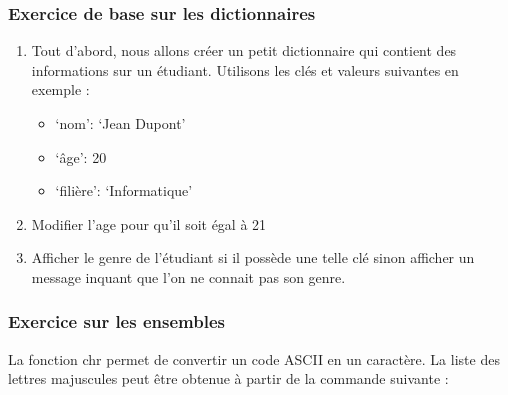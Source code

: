 \documentclass[letterpaper,10pt,english]{sphinxhowto}
\begin{document}
\subsubsection{Exercice de base sur les dictionnaires}
\label{\detokenize{cours3_conteneur_exercices:exercice-de-base-sur-les-dictionnaires}}\begin{enumerate}
%
\item {} 
\sphinxAtStartPar
Tout d’abord, nous allons créer un petit dictionnaire qui contient des informations sur un étudiant. Utilisons les clés et valeurs suivantes en exemple :
\begin{itemize}
\item {} 
\sphinxAtStartPar
‘nom’: ‘Jean Dupont’

\item {} 
\sphinxAtStartPar
‘âge’: 20

\item {} 
\sphinxAtStartPar
‘filière’: ‘Informatique’

\end{itemize}

\item {} 
\sphinxAtStartPar
Modifier l’age pour qu’il soit égal à 21

\item {} 
\sphinxAtStartPar
Afficher le genre de l’étudiant si il possède une telle clé sinon afficher un message inquant que l’on ne connait pas son genre.

\end{enumerate}


\subsubsection{Exercice sur les ensembles}
\label{\detokenize{cours3_conteneur_exercices:exercice-sur-les-ensembles}}
\sphinxAtStartPar
La fonction chr permet de convertir un code ASCII en un caractère. La liste des lettres majuscules peut être obtenue à partir de la commande suivante :

\begin{sphinxVerbatim}[commandchars=\\\{\}]
  \PYG{p}{[}    \PYG{p}{]}
\end{sphinxVerbatim}
\end{document}
